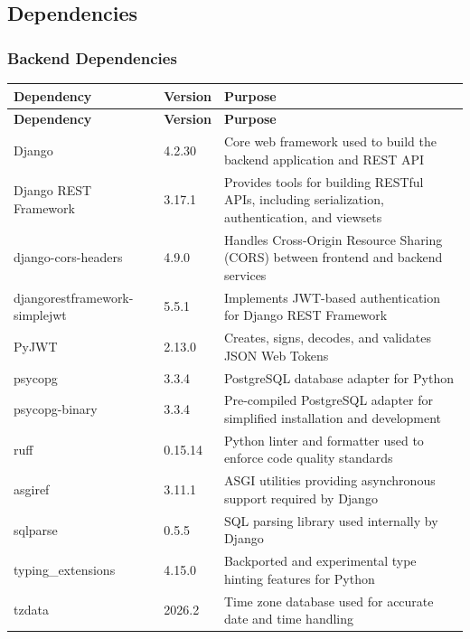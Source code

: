 \documentclass[12pt, a4paper]{article}
\begin{document}
\subsection{Dependencies}
\subsubsection{Backend Dependencies}

\begin{longtable}{L{3.6cm} C{2.0cm} L{8.8cm}}
  \color{white}\bfseries Dependency &
  \color{white}\bfseries Version &
  \color{white}\bfseries Purpose \\
  \endfirsthead
  \color{white}\bfseries Dependency &
  \color{white}\bfseries Version &
  \color{white}\bfseries Purpose \\
  \endhead
  Django & 4.2.30 & Core web framework used to build the backend application and REST API \\
  Django REST Framework & 3.17.1 & Provides tools for building RESTful APIs, including serialization, authentication, and viewsets \\
  django-cors-headers & 4.9.0 & Handles Cross-Origin Resource Sharing (CORS) between frontend and backend services \\
  djangorestframework-simplejwt & 5.5.1 & Implements JWT-based authentication for Django REST Framework \\
  PyJWT & 2.13.0 & Creates, signs, decodes, and validates JSON Web Tokens \\
  psycopg & 3.3.4 & PostgreSQL database adapter for Python \\
  psycopg-binary & 3.3.4 & Pre-compiled PostgreSQL adapter for simplified installation and development \\
  ruff & 0.15.14 & Python linter and formatter used to enforce code quality standards \\
  asgiref & 3.11.1 & ASGI utilities providing asynchronous support required by Django \\
  sqlparse & 0.5.5 & SQL parsing library used internally by Django \\
  typing\_extensions & 4.15.0 & Backported and experimental type hinting features for Python \\
  tzdata & 2026.2 & Time zone database used for accurate date and time handling \\
\end{longtable}
\end{document}
